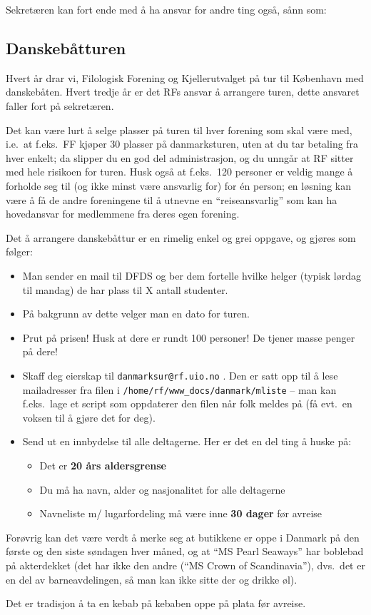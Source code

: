 Sekretæren kan fort ende med å ha ansvar for andre ting også, sånn som:
\subsection{Danskebåtturen}

Hvert år drar vi, Filologisk Forening og Kjellerutvalget på tur til København
med danskebåten. Hvert tredje år er det RFs ansvar å arrangere turen, dette
ansvaret faller fort på sekretæren.

Det kan være lurt å selge plasser på turen til hver forening som skal være med,
i.e.~at f.eks.~FF kjøper 30 plasser på danmarksturen, uten at du tar betaling
fra hver enkelt; da slipper du en god del administrasjon, og du unngår at RF
sitter med hele risikoen for turen. Husk også at f.eks.~120 personer er veldig
mange å forholde seg til (og ikke minst være ansvarlig for) for én person; en
løsning kan være å få de andre foreningene til å utnevne en ``reiseansvarlig''
som kan ha hovedansvar for medlemmene fra deres egen forening. 

Det å arrangere danskebåttur er en rimelig enkel og grei oppgave, og gjøres som
følger:
\begin{itemize}
    \item Man sender en mail til DFDS og ber dem fortelle hvilke helger (typisk
      lørdag til mandag) de har plass til X antall studenter.
    \item På bakgrunn av dette velger man en dato for turen.
    \item Prut på prisen! Husk at dere er rundt 100 personer! De tjener masse
      penger på dere!
    \item Skaff deg eierskap til \texttt{danmarksur@rf.uio.no} .
      Den er satt opp til å lese mailadresser fra filen i
      \texttt{/home/rf/www\_docs/danmark/mliste} -- man kan f.eks.~lage et
      script som oppdaterer den filen når folk meldes på (få evt.~en voksen til
      å gjøre det for deg).
    \item Send ut en innbydelse til alle deltagerne. Her er det en del ting å
      huske på:
    \begin{itemize}
        \item Det er \textbf{20 års aldersgrense}
        \item Du må ha navn, alder og nasjonalitet for alle deltagerne
        \item Navneliste m/ lugarfordeling må være inne \textbf{30 dager} før
          avreise
    \end{itemize}

\end{itemize}

Forøvrig kan det være verdt å merke seg at butikkene er oppe i Danmark på den
første og den siste søndagen hver måned, og at ``MS Pearl Seaways'' har
boblebad på akterdekket (det har ikke den andre (``MS Crown of Scandinavia''),
dvs.~det er en del av barneavdelingen, så man kan ikke sitte der og drikke øl).

Det er tradisjon å ta en kebab på kebaben oppe på plata før avreise.
